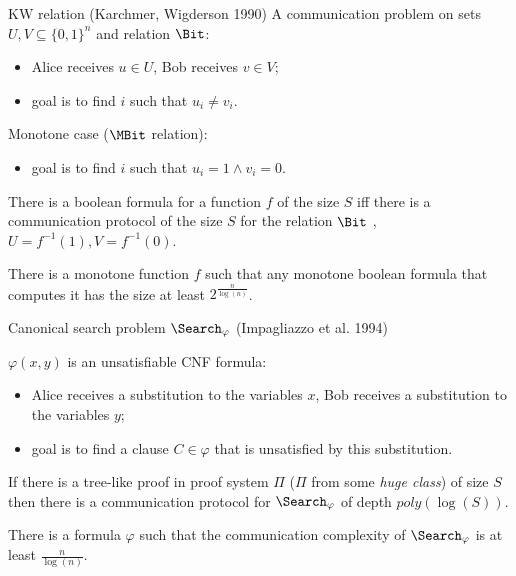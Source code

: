 \begin{frame}{KW relation (Karchmer, Wigderson 1990)}
    A communication problem on sets $U, V \subseteq \{0, 1\}^{n}$ and relation $\Bit$:
    \begin{itemize}
        \item Alice receives $u \in U$, Bob receives $v \in V$;
        \item goal is to find $i$ such that $u_i \neq v_i$.
    \end{itemize}
    \pause
    Monotone case ($\MBit$ relation):
    \begin{itemize}
        \item goal is to find $i$ such that $u_i = 1 \land v_i = 0$.
    \end{itemize}

    \pause

    \begin{theorem}
        There is a  boolean {\color{blue} formula} for a function $f$ of the
        size $S$ iff there is a communication protocol of the size $S$ for the relation $\Bit$
        , $U = f^{-1}(1), V = f^{-1}(0)$.
    \end{theorem}

    \pause
    \pause
    
    \begin{theorem}[Pitassi, G{\"{o}}{\"{o}}s, 2014]
        There is a monotone function $f$ such that any monotone boolean formula that computes it has the
        size at least $2^{\frac{n}{\log(n)}}$. 
    \end{theorem}
\end{frame}


\begin{frame}{Canonical search problem $\Search_{\varphi}$ (Impagliazzo et al. 1994)}
    
    $\varphi(x, y)$ is an unsatisfiable CNF formula:
    \begin{itemize}
        \item Alice receives a substitution to the variables $x$, Bob receives a substitution to the variables $y$;
        \item goal is to find a clause $C \in \varphi$ that is unsatisfied by this substitution.
    \end{itemize}

    \pause

    \begin{theorem}
        If there is a {\color{blue} tree-like} proof in proof system $\Pi$ ($\Pi$ from some \textit{huge class}) of size $S$
        then there is a communication protocol for $\Search_{\varphi}$ of depth $poly(\log(S))$.
    \end{theorem}

    \pause
    
    \begin{theorem}[Pitassi, G{\"{o}}{\"{o}}s, 2014]
        There is a formula $\varphi$ such that the communication complexity of $\Search_{\varphi}$ is at least
        $\frac{n}{\log(n)}$.
    \end{theorem}
\end{frame}

